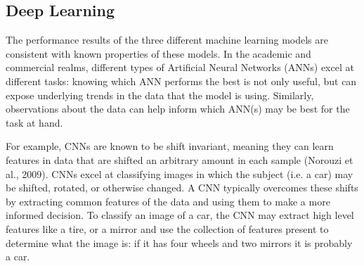 \documentclass[letterpaper, 10 pt, conference]{ieeeconf}  %
\begin{document}
\subsection{Deep Learning}

    The performance results of the three different machine learning models are consistent with known properties of these models. In the academic and commercial realms, different types of Artificial Neural Networks (ANNs) excel at different tasks: knowing which ANN performs the best is not only useful, but can expose underlying trends in the data that the model is using. Similarly, observations about the data can help inform which ANN(s) may be best for the task at hand. 

    For example, CNNs are known to be shift invariant, meaning they can learn features in data that are shifted an arbitrary amount in each sample (Norouzi et al., 2009). CNNs excel at classifying images in which the subject (i.e. a car) may be shifted, rotated, or otherwise changed. A CNN typically overcomes these shifts by extracting common features of the data and using them to make a more informed decision. To classify an image of a car, the CNN may extract high level features like a tire, or a mirror and use the collection of features present to determine what the image is: if it has four wheels and two mirrors it is probably a car. 
\end{document}
